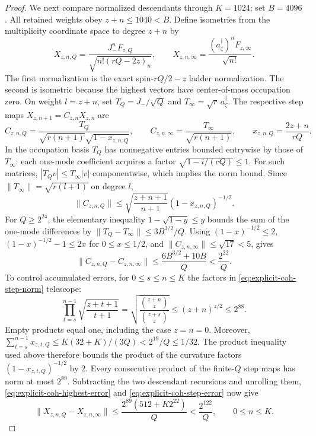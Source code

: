 \documentclass[11pt]{article}
\newcommand{\fall}[2]{(#1)_{#2}}
\begin{document}
\begin{proof}
We next compare normalized descendants through $K=1024$; set $B=4096$.
All retained weights obey $z+n\le1040<B$. Define isometries from the
multiplicity coordinate space to degree $z+n$ by
\begin{equation}
 X_{z,n,Q}=\frac{J_-^nF_{z,Q}}
  {\sqrt{n!\fall{rQ-2z}n}},\qquad
 X_{z,n,\infty}=\frac{(a_\zeta^\dagger)^nF_{z,\infty}}{\sqrt{n!}}.
\end{equation}
The first normalization is the exact spin-$rQ/2-z$ ladder
normalization. The second is isometric because the highest vectors have
center-of-mass occupation zero. On weight $l=z+n$, set
$T_Q=J_-/\sqrt Q$ and $T_\infty=\sqrt r\,a_\zeta^\dagger$.
The respective step maps $X_{z,n+1}=C_{z,n}X_{z,n}$ are
\begin{equation}\label{eq:explicit-coh-step}
 C_{z,n,Q}=\frac{T_Q}{\sqrt{r(n+1)}\sqrt{1-x_{z,n,Q}}},\qquad
 C_{z,n,\infty}=\frac{T_\infty}{\sqrt{r(n+1)}},\qquad
 x_{z,n,Q}=\frac{2z+n}{rQ}.
\end{equation}
In the occupation basis $T_Q$ has nonnegative entries bounded entrywise
by those of $T_\infty$: each one-mode coefficient acquires a factor
$\sqrt{1-i/(cQ)}\le1$. For such matrices,
$|T_Qv|\le T_\infty|v|$ componentwise, which implies the norm bound.
Since $\|T_\infty\|=\sqrt{r(l+1)}$ on degree $l$,
\begin{equation}\label{eq:explicit-coh-step-norm}
 \|C_{z,n,Q}\|
 \le\sqrt{\frac{z+n+1}{n+1}}(1-x_{z,n,Q})^{-1/2}.
\end{equation}
For $Q\ge2^{24}$, the elementary inequality
$1-\sqrt{1-y}\le y$ bounds the sum of the one-mode differences by
$\|T_Q-T_\infty\|\le3B^{3/2}/Q$.
Using $(1-x)^{-1/2}\le2$, $(1-x)^{-1/2}-1\le2x$ for $0\le x\le1/2$,
and $\|C_{z,n,\infty}\|\le\sqrt{17}<5$, gives
\begin{equation}\label{eq:explicit-coh-step-error}
 \|C_{z,n,Q}-C_{z,n,\infty}\|
 \le\frac{6B^{3/2}+10B}{Q}<\frac{2^{22}}Q.
\end{equation}
To control accumulated errors, for $0\le s\le n\le K$ the factors in
\eqref{eq:explicit-coh-step-norm} telescope:
\begin{equation}
 \prod_{t=s}^{n-1}\sqrt{\frac{z+t+1}{t+1}}
 =\sqrt{\frac{\binom{z+n}z}{\binom{z+s}z}}
 \le(z+n)^{z/2}\le2^{88}.
\end{equation}
Empty products equal one, including the case $z=n=0$.
Moreover,
$\sum_{t=s}^{n-1}x_{z,t,Q}\le K(32+K)/(3Q)<2^{19}/Q\le1/32$.
The product inequality used above therefore bounds the product of the
curvature factors $(1-x_{z,t,Q})^{-1/2}$ by $2$.
Every consecutive product of the finite-$Q$ step maps has norm at most
$2^{89}$. Subtracting the two descendant recursions and unrolling them,
\eqref{eq:explicit-coh-highest-error} and
\eqref{eq:explicit-coh-step-error} now give
\begin{equation}\label{eq:explicit-coh-descendant-error}
 \|X_{z,n,Q}-X_{z,n,\infty}\|
 \le\frac{2^{89}(512+K2^{22})}Q<\frac{2^{122}}Q,
 \qquad 0\le n\le K.
\end{equation}


\end{proof}
\end{document}
